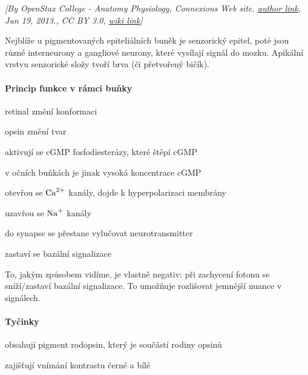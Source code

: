 \documentclass[DIV=8]{scrreprt}
\begin{document}
\emph{[By OpenStax College - Anatomy Physiology, Connexions Web site. \href{http://cnx.org/content/col11496/1.6/}{author link}, Jun 19, 2013., CC BY 3.0, \href{https://commons.wikimedia.org/w/index.php?curid=30148002}{wiki link}]}

Nejblíže u pigmentovaných epiteliálních buněk je senzorický epitel, poté jsou různé interneurony a gangliové neurony, které vysílají signál do mozku. Apikální vrstvu senzorické složy tvoří brva (či přetvořený bičík).

\paragraph{Princip funkce v rámci buňky}
\begin{myEnumerate}[nosep]
    \item retinal změní konformaci
    \item opsin změní tvar
    \item aktivují se cGMP fosfodiesterázy, které štěpí cGMP
\begin{myItemize}[nosep]
    \item v očních buňkách je jinak vysoká koncentrace cGMP
\end{myItemize}

    \item otevřou se \(\ce{Ca^{2+}}\) kanály, dojde k hyperpolarizaci membrány
    \item uzavřou se \(\ce{Na+}\) kanály
    \item do synapse se přestane vylučovat neurotransmitter
    \item zastaví se bazální signalizace
\end{myEnumerate}



To, jakým způsobem vidíme, je vlastně negativ: při zachycení fotonu se sníží/zastaví bazální signalizace. To umožňuje rozlišovat jemnější nuance v signálech.

\paragraph{Tyčinky}
\begin{myItemize}[nosep]
    \item obsahují pigment rodopsin, který je součástí rodiny opsinů
    \item zajišťují vnímání kontrastu černé a bílé
\end{myItemize}
\end{document}
